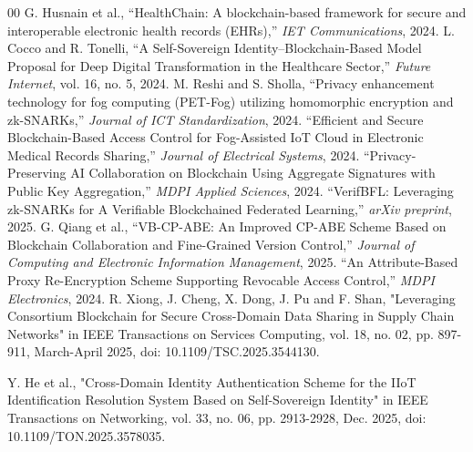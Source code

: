 \documentclass[conference]{IEEEtran}
\begin{document}
\begin{thebibliography}{00}
 G. Husnain et al., ``HealthChain: A blockchain-based framework for secure and interoperable electronic health records (EHRs),'' \textit{IET Communications}, 2024.
 L. Cocco and R. Tonelli, ``A Self-Sovereign Identity–Blockchain-Based Model Proposal for Deep Digital Transformation in the Healthcare Sector,'' \textit{Future Internet}, vol. 16, no. 5, 2024.
 M. Reshi and S. Sholla, ``Privacy enhancement technology for fog computing (PET-Fog) utilizing homomorphic encryption and zk-SNARKs,'' \textit{Journal of ICT Standardization}, 2024.
 ``Efficient and Secure Blockchain-Based Access Control for Fog-Assisted IoT Cloud in Electronic Medical Records Sharing,'' \textit{Journal of Electrical Systems}, 2024.
 ``Privacy-Preserving AI Collaboration on Blockchain Using Aggregate Signatures with Public Key Aggregation,'' \textit{MDPI Applied Sciences}, 2024.
 ``VerifBFL: Leveraging zk-SNARKs for A Verifiable Blockchained Federated Learning,'' \textit{arXiv preprint}, 2025.
 G. Qiang et al., ``VB-CP-ABE: An Improved CP-ABE Scheme Based on Blockchain Collaboration and Fine-Grained Version Control,'' \textit{Journal of Computing and Electronic Information Management}, 2025.
 ``An Attribute-Based Proxy Re-Encryption Scheme Supporting Revocable Access Control,'' \textit{MDPI Electronics}, 2024.
 R. Xiong, J. Cheng, X. Dong, J. Pu and F. Shan, "Leveraging Consortium Blockchain for Secure Cross-Domain Data Sharing in Supply Chain Networks" in IEEE Transactions on Services Computing, vol. 18, no. 02, pp. 897-911, March-April 2025, doi: 10.1109/TSC.2025.3544130.

 Y. He et al., "Cross-Domain Identity Authentication Scheme for the IIoT Identification Resolution System Based on Self-Sovereign Identity" in IEEE Transactions on Networking, vol. 33, no. 06, pp. 2913-2928, Dec. 2025, doi: 10.1109/TON.2025.3578035.
\end{thebibliography}
\vspace{12pt}
\end{document}
